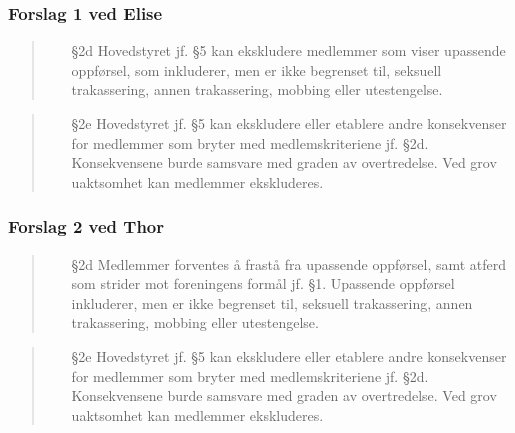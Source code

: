 \documentclass[10pt,norsk,a4paper]{article}
\begin{document}
\subsubsection{Forslag 1 ved Elise}
\begin{quote}
    \begin{enumerate}
        \item[§2d] Hovedstyret jf. §5 kan ekskludere medlemmer som viser upassende oppførsel, som inkluderer, men er ikke begrenset til, seksuell trakassering, annen trakassering, mobbing eller utestengelse.
    \end{enumerate}
\end{quote}

\begin{quote}
    \begin{enumerate}
        \item[§2e]
            Hovedstyret jf. §5 kan ekskludere eller etablere andre konsekvenser for medlemmer som bryter med medlemskriteriene jf. §2d.
            Konsekvensene burde samsvare med graden av overtredelse. Ved grov uaktsomhet kan medlemmer ekskluderes.
    \end{enumerate}
\end{quote}

\subsubsection{Forslag 2 ved Thor}
\begin{quote}
    \begin{enumerate}
        \item[§2d]
            Medlemmer forventes å frastå fra upassende oppførsel, samt atferd som strider mot foreningens formål jf. §1.
            Upassende oppførsel inkluderer, men er ikke begrenset til, seksuell trakassering, annen trakassering, mobbing eller utestengelse.
    \end{enumerate}
\end{quote}

\begin{quote}
    \begin{enumerate}
        \item[§2e]
            Hovedstyret jf. §5 kan ekskludere eller etablere andre konsekvenser for medlemmer som bryter med medlemskriteriene jf. §2d.
            Konsekvensene burde samsvare med graden av overtredelse. Ved grov uaktsomhet kan medlemmer ekskluderes.
    \end{enumerate}
\end{quote}
\end{document}
